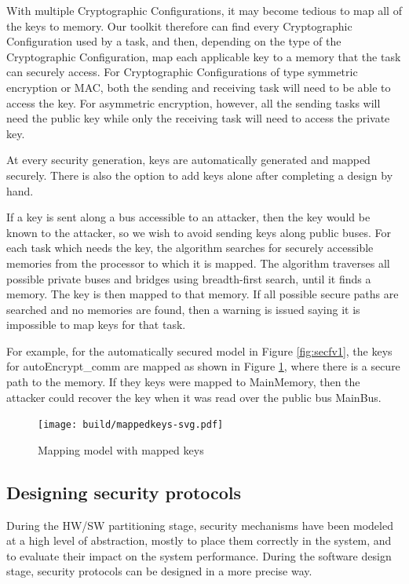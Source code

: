 \documentclass[12pt]{article}
\begin{document}
With multiple Cryptographic Configurations, it may become tedious to map all of the keys to memory. Our toolkit therefore can find every Cryptographic Configuration used by a task, and then, depending on the type of the Cryptographic Configuration, map each applicable key to a memory that the task can securely access. For Cryptographic Configurations of type symmetric encryption or MAC, both the sending and receiving task will need to be able to access the key. For asymmetric encryption, however, all the sending tasks will need the public key while only the receiving task will need to access the private key. 

At every security generation, keys are automatically generated and mapped securely. There is also the option to add keys alone after completing a design by hand.

If a key is sent along a bus accessible to an attacker, then the key would be known to the attacker, so we wish to avoid sending keys along public buses. For each task which needs the key, the algorithm searches for securely accessible memories from the processor to which it is mapped. The algorithm traverses all possible private buses and bridges using breadth-first search, until it finds a memory. The key is then mapped to that memory. If all possible secure paths are searched and no memories are found, then a warning is issued saying it is impossible to map keys for that task.

For example, for the automatically secured model in Figure \ref{fig:secfv1}, the keys for autoEncrypt\_comm are mapped as shown in Figure \ref{fig:mapkey}, where there is a secure path to the memory. If they keys were mapped to MainMemory, then the attacker could recover the key when it was read over the public bus MainBus. 

\begin{figure}[htbp]
\centering
\texttt{[image: build/mappedkeys-svg.pdf]}
\caption{Mapping model with mapped keys} \label{fig:mapkey}
\end{figure}

\subsection{Designing security protocols}
During the HW/SW partitioning stage, security mechanisms have been modeled at a high level of abstraction, mostly to place them correctly in the system, and to evaluate their impact on the system performance. During the software design stage, security protocols can be designed in a more precise way.
\end{document}
